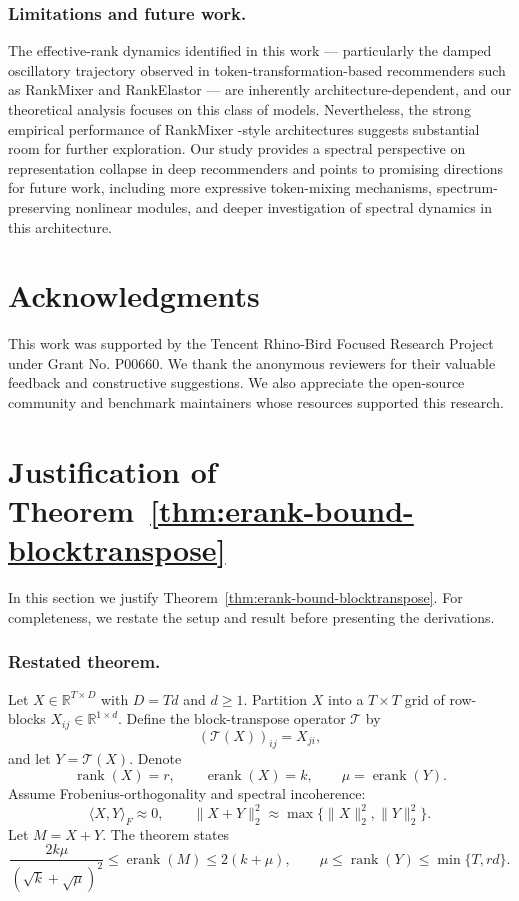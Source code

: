 \documentclass[sigconf,screen]{acmart}
\newcommand{\unimixer}{RankElastor }
\newcommand{\rankmixer}{RankMixer }
\begin{document}
\subsubsection*{\bf Limitations and future work.} The effective-rank dynamics identified in this work — particularly the damped oscillatory trajectory observed in token-transformation-based recommenders such as \rankmixer and \unimixer — are inherently architecture-dependent, and our theoretical analysis focuses on this class of models. 
Nevertheless, the strong empirical performance of \rankmixer-style architectures suggests substantial room for further exploration. 
Our study provides a spectral perspective on representation collapse in deep recommenders and points to promising directions for future work, including more expressive token-mixing mechanisms, spectrum-preserving nonlinear modules, and deeper investigation of spectral dynamics in this architecture.

\section*{Acknowledgments}

This work was supported by the Tencent Rhino-Bird Focused Research Project under Grant No. P00660.
We thank the anonymous reviewers for their valuable feedback and constructive suggestions. 
We also appreciate the open-source community and benchmark maintainers whose resources supported this research.




\appendix
\section{Justification of Theorem~\ref{thm:erank-bound-blocktranspose}}
\label{app:thm:erank-bound-blocktranspose}

In this section we justify Theorem~\ref{thm:erank-bound-blocktranspose}. For completeness, we restate the setup and result before presenting the derivations.

\subsubsection*{\bf Restated theorem.} 
Let $X\in\mathbb R^{T\times D}$ with $D=Td$ and $d\ge 1$. Partition $X$ into a $T\times T$ grid of row-blocks $X_{ij}\in\mathbb R^{1\times d}$. Define the block-transpose operator $\mathcal T$ by
\[
(\mathcal T(X))_{ij}=X_{ji},
\]
and let $Y=\mathcal T(X)$.
Denote
\[
\operatorname{rank}(X)=r,
\qquad
\operatorname{erank}(X)=k,
\qquad
\mu=\operatorname{erank}(Y).
\]
Assume Frobenius-orthogonality and spectral incoherence:
\[
\langle X,Y\rangle_F \approx 0,
\qquad
\|X+Y\|_2^2 \approx \max\{\|X\|_2^2,\|Y\|_2^2\}.
\]
Let $M=X+Y$. The theorem states
\[
\frac{2k\mu}{(\sqrt{k}+\sqrt{\mu})^2}
\le
\operatorname{erank}(M)
\le
2(k+\mu),
\qquad
\mu \le \operatorname{rank}(Y)\le \min\{T,rd\}.
\]
\end{document}
